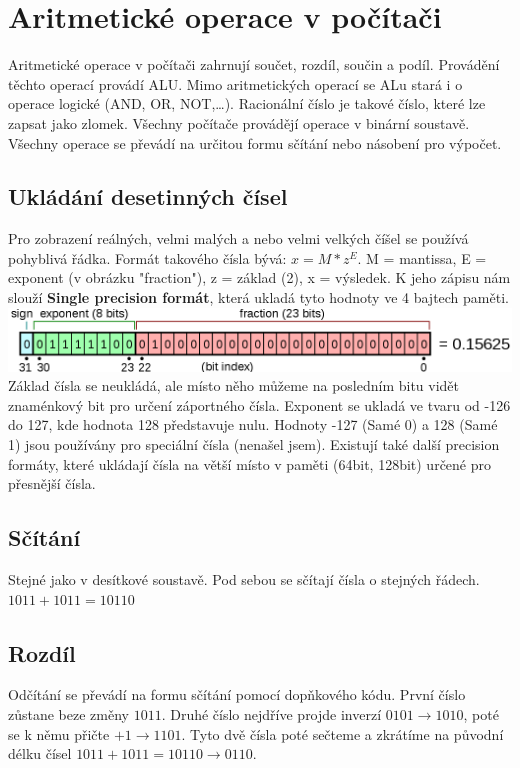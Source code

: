 \section{Aritmetické operace v počítači}
\label{sec:aritmeticke-operace}
Aritmetické operace v počítači zahrnují součet, rozdíl, součin a podíl.
Provádění těchto operací provádí ALU.
Mimo aritmetických operací se ALu stará i o operace logické (AND, OR, NOT,\dots).
Racionální číslo je takové číslo, které lze zapsat jako zlomek.
Všechny počítače provádějí operace v binární soustavě.
Všechny operace se převádí na určitou formu sčítání nebo násobení pro výpočet.
\subsection{Ukládání desetinných čísel}
Pro zobrazení reálných, velmi malých a nebo velmi velkých číšel se používá pohyblivá řádka.
Formát takového čísla bývá: $x = M*z^E$.
M = mantissa, E = exponent (v obrázku "fraction"), z = základ (2), x = výsledek.
K jeho zápisu nám slouží \textbf{Single precision formát}, která ukladá tyto hodnoty ve 4 bajtech paměti.\\

\includegraphics[width=\linewidth]{TVY-POS/Ciselne-soustavy/single_precision.png}\\

Základ čísla se neukládá, ale místo něho můžeme na posledním bitu vidět znaménkový bit pro určení záportného čísla.
Exponent se ukladá ve tvaru od -126 do 127, kde hodnota 128 představuje nulu.
Hodnoty -127 (Samé 0) a 128 (Samé 1) jsou používány pro speciální čísla (nenašel jsem).
Existují také další precision formáty, které ukládají čísla na větší místo v paměti (64bit, 128bit) určené pro přesnější čísla.

\subsection{Sčítání}
Stejné jako v desítkové soustavě.
Pod sebou se sčítají čísla o stejných řádech.
$1011 + 1011 = 10110$

\subsection{Rozdíl}
Odčítání se převádí na formu sčítání pomocí dopňkového kódu.
První číslo zůstane beze změny $1011$.
Druhé číslo nejdříve projde inverzí $0101 \rightarrow 1010$, poté se k němu přičte $+1 \rightarrow 1101$.
Tyto dvě čísla poté sečteme a zkrátíme na původní délku čísel $1011 + 1011 = 10110 \rightarrow 0110$.

